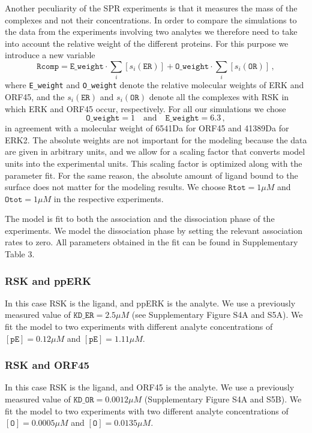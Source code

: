 \documentclass[12pt]{article}
\begin{document}
	Another peculiarity of the SPR experiments is that it measures
	the mass of the complexes and not their concentrations. In order to compare the simulations to the data from the experiments involving two analytes we therefore need to take into account the relative weight of the different proteins. For this purpose we introduce a new variable 
	\begin{equation}
		\texttt{Rcomp}=\texttt{E\_weight}\cdot\sum_{i}[s_{i}(\texttt{ER})]+\texttt{O\_weight}\cdot\sum_{i}[s_{i}(\texttt{OR})]\,,
	\end{equation}
	where \texttt{E\_weight} and \texttt{O\_weight} denote the relative
	molecular weights of ERK and ORF45, and the $s_{i}(\texttt{ER})$
	and $s_{i}(\texttt{OR})$ denote all the complexes with RSK in which
	ERK and ORF45 occur, respectively. For all our simulations we chose
	\begin{equation}
		\texttt{O\_weight}=1\quad\text{and}\quad\texttt{E\_weight}=6.3\,,
	\end{equation}
	in agreement with a molecular weight of 6541Da for ORF45 and 41389Da
	for ERK2. The absolute weights are not important for the modeling
	because the data are given in arbitrary units, and we allow for a
	scaling factor that converts model units into the experimental units.
	This scaling factor is optimized along with the parameter fit. For
	the same reason, the absolute amount of ligand bound to the surface
	does not matter for the modeling results. We choose $\texttt{Rtot}=1\mu M$
	and $\texttt{Otot}=1\mu M$ in the respective experiments.
	
	The model is fit to both the association and the dissociation phase
	of the experiments. We model the dissociation phase by setting the
	relevant association rates to zero. All parameters obtained in the fit can be found in Supplementary Table 3.
	
	\subsubsection{RSK and ppERK}
	\label{sss:er} In this case RSK is the ligand, and ppERK is the analyte.
	We use a previously measured value of $\texttt{KD\_ER}=2.5\mu M$ (see Supplementary Figure S4A and S5A). We fit the model to two experiments with different analyte concentrations of $[\texttt{pE}]=0.12\mu M$ and
	$[\texttt{pE}]=1.11\mu M$.
	
	
	\subsubsection{RSK and ORF45}
	In this case RSK is the ligand, and ORF45 is the analyte. We use a
	previously measured value of $\texttt{KD\_OR}=0.0012\mu M$ (Supplementary Figure S4A and S5B). We fit the model to two experiments with two different analyte concentrations of $[\texttt{O}]=0.0005\mu M$ and $[\texttt{O}]=0.0135\mu M$.
	
\end{document}
